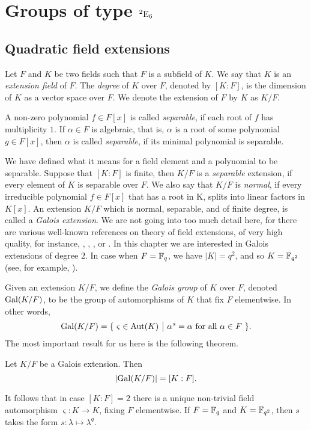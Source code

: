 \chapter{Groups of type ${}^2\mathord{\mathrm{E}}_6$}
\ifpdf
    \graphicspath{{Chapter3/Chapter3Figs/PNG/}{Chapter3/Chapter3Figs/PDF/}{Chapter3/Chapter3Figs/}}
\else
    \graphicspath{{Chapter3/Chapter3Figs/EPS/}{Chapter3/Chapter3Figs/}}
\fi

\section{Quadratic field extensions}

Let $F$ and $K$ be two fields such that $F$ is a subfield of $K$. We say that 
$K$ is an \textit{extension field} of $F$. The \textit{degree} of $K$ over $F$, 
denoted by $[K:F]$, is the dimension of $K$ as a vector space over $F$. We denote the
extension of $F$ by $K$ as $K / F$.

A non-zero polynomial $f \in F[x]$ is called \textit{separable}, if each root of $f$ has 
multiplicity $1$. If $\alpha \in F$ is algebraic, that is, $\alpha$ is a root of some polynomial
$g \in F[x]$, then $\alpha$ is called \textit{separable}, if its minimal polynomial is separable. 

We have defined what it means for a field element and a polynomial to be separable. Suppose that
$[K:F]$ is finite, then $K / F$ is a \textit{separable} extension, if every element of $K$ is 
separable over $F$. We also say that $K / F$ is \textit{normal}, if every irreducible 
polynomial $f \in F[x]$ that has a root in K, splits into linear factors in $K[x]$. An extension
$K / F$ which is normal, separable, and of finite degree, is called a \textit{Galois extension}.
We are not going into too much detail here, for there are various  well-known references on theory
of field extensions, of very high quality, for instance, \cite{PeterCameron}, \cite{DummitFoote}, \cite{Lang}, or \cite{Stewart}. In this chapter
we are interested in Galois extensions of degree $2$. 
In case when $F = \mathbb{F}_q$, we have $|K| = q^2$, and so $K = \mathbb{F}_{q^2}$ (see, for example, \cite{Moore}).

Given an extension $K / F$, we define the \textit{Galois group} of $K$ over $F$, denoted
$\mathrm{Gal}(K / F)$, to be the group
of automorphisms of $K$ that fix $F$ elementwise. In other words,
\begin{equation}
	\Gal(K / F) = \{\ \varsigma \in \Aut(K)\ \big|\ \alpha^{s} = \alpha\ \mbox{for all}\ 
		\alpha \in F\ \}.
\end{equation}
The most important result for us here is the following theorem.
\begin{theorem}
	Let $K / F$ be a Galois extension. Then
	\begin{equation}
		| \mathrm{Gal}(K / F) | = [K : F].
	\end{equation}
\end{theorem}
It follows that in case $[K:F] = 2$ there is a unique non-trivial field automorphism 
$\varsigma : K \rightarrow K$, fixing $F$ elementwise. If $F = \mathbb{F}_q$ and $K = \mathbb{F}_{q^2}$, then
$s$ takes the form $s : \lambda \mapsto \lambda^q$. 


